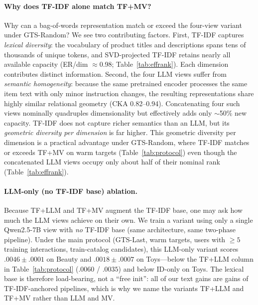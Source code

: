 \documentclass[sigconf,natbib=true,anonymous]{acmart}
\newcommand{\tfidf}{\textsc{TF-IDF}\xspace}
\newcommand{\tfllm}{\textsc{TF+LLM}\xspace}
\newcommand{\tfmv}{\textsc{TF+MV}\xspace}
\begin{document}
\paragraph{Why does TF-IDF alone match \tfmv?}
Why can a bag-of-words representation match or exceed the four-view variant under GTS-Random?
We see two contributing factors.
First, \tfidf captures \emph{lexical diversity}: the vocabulary of product titles and descriptions spans tens of thousands of unique tokens, and SVD-projected TF-IDF retains nearly all available capacity (ER/dim $\approx$0.98; Table~\ref{tab:effrank}).
Each dimension contributes distinct information.
Second, the four LLM views suffer from \emph{semantic homogeneity}: because the same pretrained encoder processes the same item text with only minor instruction changes, the resulting representations share highly similar relational geometry (CKA 0.82--0.94).
Concatenating four such views nominally quadruples dimensionality but effectively adds only $\sim$50\% new capacity.
TF-IDF does not capture richer semantics than an LLM, but its \emph{geometric diversity per dimension} is far higher.
This geometric diversity per dimension is a practical advantage under GTS-Random, where \tfidf matches or exceeds \tfmv on warm targets (Table~\ref{tab:protocol}) even though the concatenated LLM views occupy only about half of their nominal rank (Table~\ref{tab:effrank}).

\paragraph{LLM-only (no \tfidf base) ablation.}
Because \tfllm and \tfmv augment the \tfidf base, one may ask how much the LLM views achieve on their own.
We train a variant using only a single Qwen2.5-7B view with \emph{no} \tfidf base (same architecture, same two-phase pipeline).
Under the main protocol (GTS-Last, warm targets, users with $\ge 5$ training interactions, train-catalog candidates), this LLM-only variant scores $.0046\pm.0001$ on Beauty and $.0018\pm.0007$ on Toys---below the \tfllm column in Table~\ref{tab:protocol} ($.0060$ / $.0035$) and below ID-only on Toys.
The lexical base is therefore load-bearing, not a ``free init'': all of our text gains are gains of \tfidf-anchored pipelines, which is why we name the variants \tfllm and \tfmv rather than LLM and MV.
\end{document}
